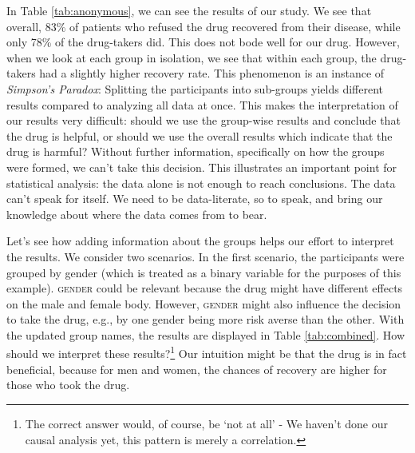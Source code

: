 \documentclass[nobib]{tufte-handout}
\begin{document}
In Table \ref{tab:anonymous}, we can see the results of our study. 
We see that overall, 83\% of patients who refused the drug recovered from their disease, while only 78\% of the drug-takers did. 
This does not bode well for our drug.
However, when we look at each group in isolation, we see that within each group, the drug-takers had a slightly higher recovery rate.
This phenomenon is an instance of \textit{Simpson's Paradox}: Splitting the participants into sub-groups yields different results compared to analyzing all data at once.
This makes the interpretation of our results very difficult: should we use the group-wise results and conclude that the drug is helpful, or should we use the overall results which indicate that the drug is harmful? 
Without further information, specifically on how the groups were formed, we can't take this decision.
This illustrates an important point for statistical analysis: the data alone is not enough to reach conclusions.
The data can't speak for itself. 
We need to be data-literate, so to speak, and bring our knowledge about where the data comes from to bear.

Let's see how adding information about the groups helps our effort to interpret the results. 
We consider two scenarios.
In the first scenario, the participants were grouped by gender (which is treated as a binary variable for the purposes of this example).
\textsc{gender} could be relevant because the drug might have different effects on the male and female body. 
However, \textsc{gender} might also influence the decision to take the drug, e.g., by one gender being more risk averse than the other. 
With the updated group names, the results are displayed in Table \ref{tab:combined}.
How should we interpret these results?\footnote{The correct answer would, of course, be `not at all' - We haven't done our causal analysis yet, this pattern is merely a correlation.}
Our intuition might be that the drug is in fact beneficial, because for men and women, the chances of recovery are higher for those who took the drug.
\end{document}
